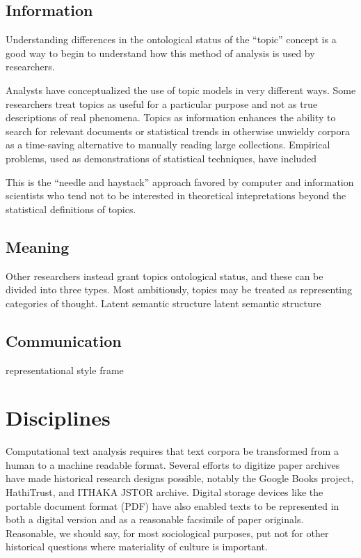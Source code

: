 \documentclass[]{book}
\begin{document}
\section{Information}\label{information}

Understanding differences in the ontological status of the ``topic''
concept is a good way to begin to understand how this method of analysis
is used by researchers.

Analysts have conceptualized the use of topic models in very different
ways. Some researchers treat topics as useful for a particular purpose
and not as true descriptions of real phenomena. Topics as information
enhances the ability to search for relevant documents or statistical
trends in otherwise unwieldy corpora as a time-saving alternative to
manually reading large collections. \citep{Boyd-Graber2017Applications}
Empirical problems, used as demonstrations of statistical techniques,
have included

This is the ``needle and haystack'' approach favored by computer and
information scientists who tend not to be interested in theoretical
intepretations beyond the statistical definitions of topics.

\section{Meaning}\label{meaning}

Other researchers instead grant topics ontological status, and these can
be divided into three types. Most ambitiously, topics may be treated as
representing categories of thought. Latent semantic structure latent
semantic structure \citep{WallachStatisticalTopicModels2011}

\section{Communication}\label{communication}

representational style \citep{Grimmer2016Measuring} frame
\citep{DiMaggio2013Exploiting}

\chapter{Disciplines}\label{kd-d}

Computational text analysis requires that text corpora be transformed
from a human to a machine readable format. Several efforts to digitize
paper archives have made historical research designs possible, notably
the Google Books project, HathiTrust, and ITHAKA JSTOR archive. Digital
storage devices like the portable document format (PDF) have also
enabled texts to be represented in both a digital version and as a
reasonable facsimile of paper originals. Reasonable, we should say, for
most sociological purposes, put not for other historical questions where
materiality of culture is important.
\citep[149]{Schreibman2014NonConsumptive}
\end{document}
